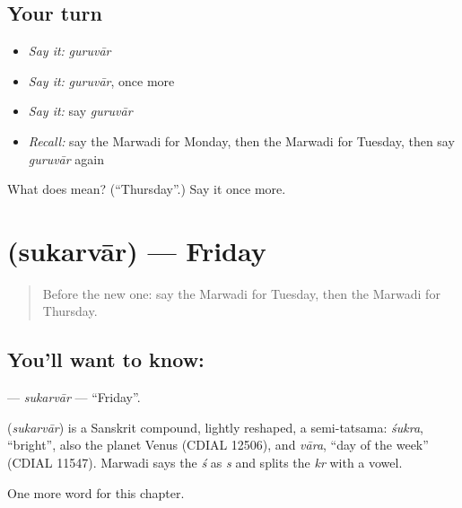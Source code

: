 \subsection*{Your turn}
\begin{itemize}
\raggedright
  \item \emph{Say it:} \emph{guruvār}
  \item \emph{Say it:} \emph{guruvār}, once more
  \item \emph{Say it:} say \emph{guruvār}
  \item \emph{Recall:} say the Marwadi for Monday, then the Marwadi for Tuesday, then say \emph{guruvār} again
\end{itemize}

\begin{tcolorbox}[breakable,colback=teal!4,colframe=teal!35!black,title={Before you move on}]
What does  mean? (\textquotedblleft{}Thursday\textquotedblright{}.) Say it once more.
\end{tcolorbox}
\section[\texorpdfstring{\mw{सुकरवार} (sukarvār)}{सुकरवार (sukarvār)}]{ (sukarvār) — Friday}

\label{lesson:MW-C91-sukarvar}



\begin{quote}
Before the new one: say the Marwadi for Tuesday, then the Marwadi for Thursday.
\end{quote}

\subsection*{You'll want to know: }
\textbf{} — \emph{sukarvār} — \textquotedblleft{}Friday\textquotedblright{}.

\begin{cousinweb}
\textbf{} (\emph{sukarvār}) is a Sanskrit compound, lightly reshaped, a semi-tatsama: \emph{śukra}, \textquotedblleft{}bright\textquotedblright{}, also the planet Venus (CDIAL 12506), and \emph{vāra}, \textquotedblleft{}day of the week\textquotedblright{} (CDIAL 11547). Marwadi says the \emph{ś} as \emph{s} and splits the \emph{kr} with a vowel.
\end{cousinweb}

\begin{grammarlens}[title={What you've built}]
One more word for this chapter.
\end{grammarlens}


